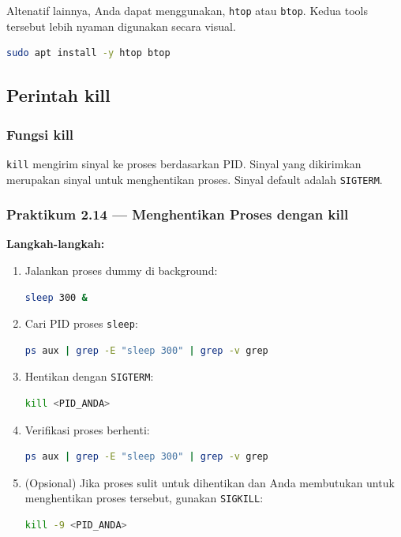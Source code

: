 \begin{tipbox}
Altenatif lainnya, Anda dapat menggunakan, \texttt{htop} atau \texttt{btop}. Kedua tools tersebut lebih nyaman digunakan secara visual.
\begin{lstlisting}[language=bash]
sudo apt install -y htop btop
\end{lstlisting}
\end{tipbox}

\subsection{Perintah kill}
\subsubsection*{Fungsi kill}
\texttt{kill} mengirim sinyal ke proses berdasarkan PID. Sinyal yang dikirimkan merupakan sinyal untuk menghentikan proses.
Sinyal default adalah \texttt{SIGTERM}.

\subsubsection*{Praktikum 2.14 --- Menghentikan Proses dengan kill}
\textbf{Langkah-langkah:}
\begin{enumerate}
    \item Jalankan proses dummy di background:
\begin{lstlisting}[language=bash, caption={Membuat proses dummy}]
sleep 300 &
\end{lstlisting}

    \item Cari PID proses \texttt{sleep}:
\begin{lstlisting}[language=bash, caption={Mencari PID sleep}]
ps aux | grep -E "sleep 300" | grep -v grep
\end{lstlisting}

    \item Hentikan dengan \texttt{SIGTERM}:
\begin{lstlisting}[language=bash, caption={Mengirim SIGTERM}]
kill <PID_ANDA>
\end{lstlisting}

    \item Verifikasi proses berhenti:
\begin{lstlisting}[language=bash, caption={Verifikasi proses sudah berhenti}]
ps aux | grep -E "sleep 300" | grep -v grep
\end{lstlisting}

    \item (Opsional) Jika proses sulit untuk dihentikan dan Anda membutukan untuk menghentikan proses tersebut, gunakan \texttt{SIGKILL}:
\begin{lstlisting}[language=bash, caption={Mengirim SIGKILL (opsional)}]
kill -9 <PID_ANDA>
\end{lstlisting}
\end{enumerate}

